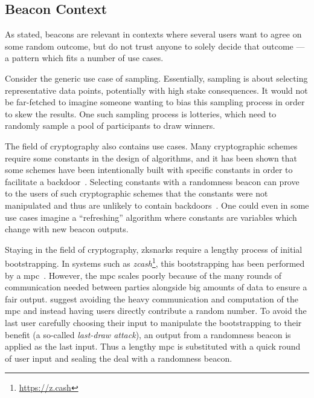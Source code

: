 \subsection{Beacon Context}
As stated, beacons are relevant in contexts where several users want to agree on some random outcome, but do not trust anyone to solely decide that outcome --- a pattern which fits a number of use cases.

Consider the generic use case of sampling.
Essentially, sampling is about selecting representative data points, potentially with high stake consequences.
It would not be far-fetched to imagine someone wanting to bias this sampling process in order to skew the results.
One such sampling process is lotteries, which need to randomly sample a pool of participants to draw winners.

The field of cryptography also contains use cases.
Many cryptographic schemes require some constants in the design of algorithms, and it has been shown that some schemes have been intentionally built with specific constants in order to facilitate a backdoor~\cite{nist2014backdoor}.
Selecting constants with a randomness beacon can prove to the users of such cryptographic schemes that the constants were not manipulated and thus are unlikely to contain backdoors~\cite{baigneres2015trap}.
One could even in some use cases imagine a \enquote{refreshing} algorithm where constants are variables which change with new beacon outputs.

Staying in the field of cryptography, \glspl{zksnark} require a lengthy process of initial bootstrapping.
In systems such as \textit{zcash}\footnote{\url{https://z.cash}}, this bootstrapping has been performed by a \gls{mpc}~\cite{snarkparameters}.
However, the \gls{mpc} scales poorly because of the many rounds of communication needed between parties alongside big amounts of data to ensure a fair output.
\citet{mpcsnarks} suggest avoiding the heavy communication and computation of the \gls{mpc} and instead having users directly contribute a random number.
To avoid the last user carefully choosing their input to manipulate the bootstrapping to their benefit (a so-called \emph{last-draw attack}), an output from a randomness beacon is applied as the last input.
Thus a lengthy \gls{mpc} is substituted with a quick round of user input and sealing the deal with a randomness beacon.


